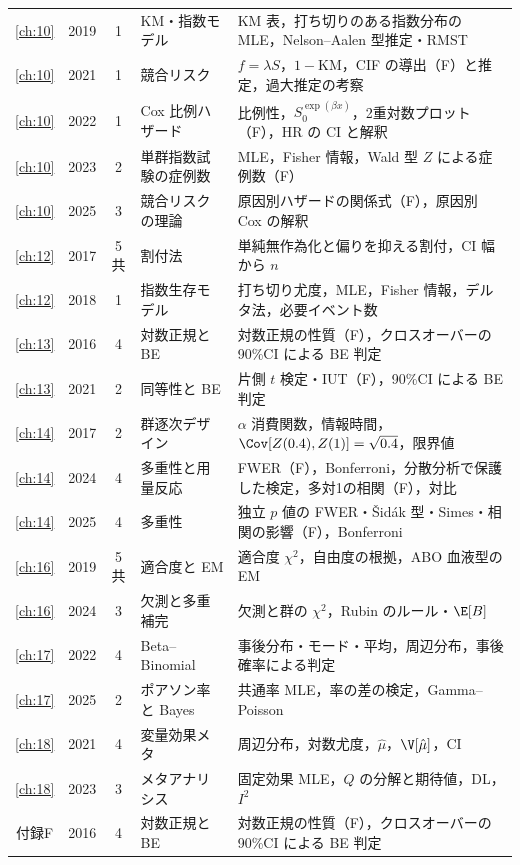 \begin{center}
\begin{longtable}{@{}cccL{36mm}L{78mm}@{}}
\ref{ch:10} & 2019 & 1 & KM・指数モデル & KM 表，打ち切りのある指数分布の MLE，Nelson--Aalen 型推定・RMST\\
\ref{ch:10} & 2021 & 1 & 競合リスク & $f=\lambda S$，$1-$KM，CIF の導出（F）と推定，過大推定の考察\\
\ref{ch:10} & 2022 & 1 & Cox 比例ハザード & 比例性，$S_0^{\exp(\beta x)}$，2重対数プロット（F），HR の CI と解釈\\
\ref{ch:10} & 2023 & 2 & 単群指数試験の症例数 & MLE，Fisher 情報，Wald 型 $Z$ による症例数（F）\\
\ref{ch:10} & 2025 & 3 & 競合リスクの理論 & 原因別ハザードの関係式（F），原因別 Cox の解釈\\
\midrule
\ref{ch:12} & 2017 & 5共 & 割付法 & 単純無作為化と偏りを抑える割付，CI 幅から $n$\\
\ref{ch:12} & 2018 & 1 & 指数生存モデル & 打ち切り尤度，MLE，Fisher 情報，デルタ法，必要イベント数\\
\midrule
\ref{ch:13} & 2016 & 4 & 対数正規と BE & 対数正規の性質（F），クロスオーバーの90\%CI による BE 判定\\
\ref{ch:13} & 2021 & 2 & 同等性と BE & 片側 $t$ 検定・IUT（F），90\%CI による BE 判定\\
\midrule
\ref{ch:14} & 2017 & 2 & 群逐次デザイン & $\alpha$ 消費関数，情報時間，$\Cov[Z(0.4),Z(1)]=\sqrt{0.4}$，限界値\\
\ref{ch:14} & 2024 & 4 & 多重性と用量反応 & FWER（F），Bonferroni，分散分析で保護した検定，多対1の相関（F），対比\\
\ref{ch:14} & 2025 & 4 & 多重性 & 独立 $p$ 値の FWER・Šidák 型・Simes・相関の影響（F），Bonferroni\\
\midrule
\ref{ch:16} & 2019 & 5共 & 適合度と EM & 適合度 $\chi^2$，自由度の根拠，ABO 血液型の EM\\
\ref{ch:16} & 2024 & 3 & 欠測と多重補完 & 欠測と群の $\chi^2$，Rubin のルール・$\E[B]$\\
\midrule
\ref{ch:17} & 2022 & 4 & Beta--Binomial & 事後分布・モード・平均，周辺分布，事後確率による判定\\
\ref{ch:17} & 2025 & 2 & ポアソン率と Bayes & 共通率 MLE，率の差の検定，Gamma--Poisson\\
\midrule
\ref{ch:18} & 2021 & 4 & 変量効果メタ & 周辺分布，対数尤度，$\hat\mu$，$\V[\hat\mu]$，CI\\
\ref{ch:18} & 2023 & 3 & メタアナリシス & 固定効果 MLE，$Q$ の分解と期待値，DL，$I^2$\\
\midrule
付録F & 2016 & 4 & 対数正規と BE & 対数正規の性質（F），クロスオーバーの90\%CI による BE 判定\\

\end{longtable}
\end{center}
